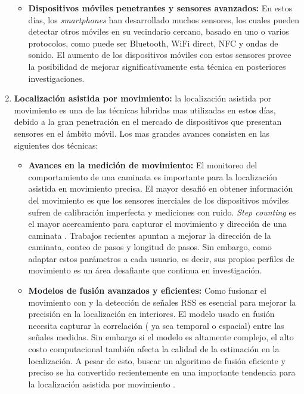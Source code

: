 \begin{enumerate}
\begin{itemize}
\item \textbf{Dispositivos móviles penetrantes y sensores avanzados:} En estos días, los \textit{smartphones} han desarrollado muchos sensores, los cuales pueden detectar otros móviles en su vecindario cercano, basado en uno o varios protocolos, como puede ser Bluetooth, WiFi direct, NFC y ondas de sonido. El aumento de los dispositivos móviles con estos sensores provee la posibilidad de mejorar significativamente esta técnica en posteriores investigaciones.
\end{itemize}


\item \textbf{Localización asistida por movimiento: } la localización asistida por movimiento es una de las técnicas híbridas mas utilizadas en estos días, debido a la gran penetración en el mercado de dispositivos que presentan sensores en el ámbito móvil. Los mas grandes avances consisten en las siguientes dos técnicas:

\begin{itemize}
\item \textbf{Avances en la medición de movimiento:} El monitoreo del comportamiento de una caminata es importante para la localización asistida en movimiento precisa. El mayor desafió en obtener información del movimiento es que los sensores inerciales de los dispositivos móviles sufren de calibración imperfecta y mediciones con ruido. \textit{Step counting} es el mayor acercamiento para capturar el movimiento y dirección de una caminata \citep{6407455}. Trabajos recientes apuntan a mejorar la dirección de la caminata, conteo de pasos y longitud de pasos. Sin embargo, como adaptar estos parámetros a cada usuario, es decir, sus propios perfiles de movimiento es un área desafiante que continua en investigación.

\item \textbf{Modelos de fusión avanzados y eficientes:} Como fusionar el movimiento con y la detección de señales RSS es esencial para mejorar la precisión en la localización en interiores. El modelo usado en fusión necesita capturar la correlación ( ya sea temporal o espacial) entre las señales medidas. Sin embargo si el modelo es altamente complejo, el alto costo computacional también afecta la calidad de la estimación en la localización. A pesar de esto, buscar un algoritmo de fusión  eficiente y preciso se ha convertido recientemente en una importante tendencia para la localización asistida por movimiento \citep{6846747}.

\end{itemize}
\end{enumerate}